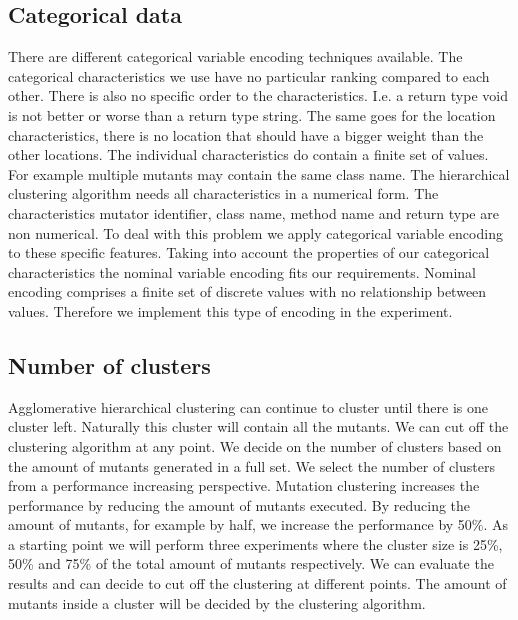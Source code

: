 \documentclass[../../main]{subfiles}
\begin{document}
\subsection{Categorical data}
There are different categorical variable encoding techniques available\cite{Potdar2017AClassifiers}.
The categorical characteristics we use have no particular ranking compared to each other.
There is also no specific order to the characteristics.
I.e. a return type void is not better or worse than a return type string.
The same goes for the location characteristics, there is no location that should have a bigger weight than the other locations.
The individual characteristics do contain a finite set of values.
For example multiple mutants may contain the same class name.
The hierarchical clustering algorithm needs all characteristics in a numerical form\cite{Vijaya2019ComparativeClustering}.
The characteristics mutator identifier, class name, method name and return type are non numerical.
To deal with this problem we apply categorical variable encoding to these specific features.
Taking into account the properties of our categorical characteristics the nominal variable encoding fits our requirements.
Nominal encoding comprises a finite set of discrete values with no relationship between values\cite{Potdar2017AClassifiers}.
Therefore we implement this type of encoding in the experiment.

\subsection{Number of clusters}
Agglomerative hierarchical clustering can continue to cluster until there is one cluster left. 
Naturally this cluster will contain all the mutants.
We can cut off the clustering algorithm at any point.
We decide on the number of clusters based on the amount of mutants generated in a full set.
We select the number of clusters from a performance increasing perspective.
Mutation clustering increases the performance by reducing the amount of mutants executed\cite{Pizzoleto2019}.
By reducing the amount of mutants, for example by half, we increase the performance by 50\%\cite{Just2014AreTesting}.
As a starting point we will perform three experiments where the cluster size is 25\%, 50\% and 75\% of the total amount of mutants respectively.
We can evaluate the results and can decide to cut off the clustering at different points.
The amount of mutants inside a cluster will be decided by the clustering algorithm.
\end{document}
